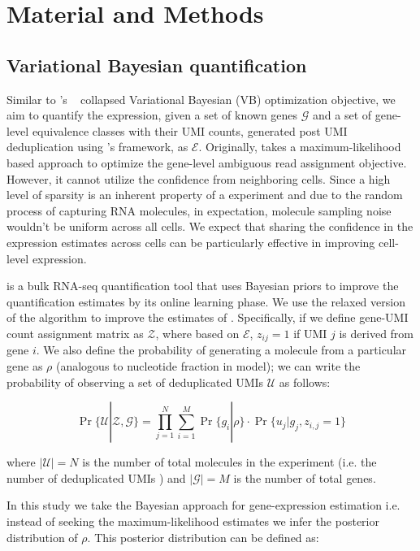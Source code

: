 \section{Material and Methods}
\label{sec:alv2_methods}

\subsection{Variational Bayesian \dscrnaseq quantification}
Similar to \salmon 's ~\citep{salmon} collapsed Variational Bayesian (VB) optimization 
objective, we aim to quantify the expression, given a set of known genes $\mathcal{G}$ and a set
of gene-level equivalence classes with their UMI counts, generated post UMI deduplication using \alevin 's 
framework, as $\mathcal{E}$. Originally, \alevin takes a maximum-likelihood based approach to 
optimize the gene-level ambiguous read assignment objective. However, it cannot utilize the 
confidence from neighboring cells. Since a high level of sparsity is an inherent property of a \dscrnaseq
experiment and due to the random process of capturing RNA molecules, in expectation, molecule 
sampling noise wouldn't be uniform across all cells. We expect that sharing the confidence in 
the expression estimates across cells can be particularly effective in improving cell-level expression. 

\salmon is a bulk RNA-seq quantification tool that uses Bayesian priors to improve the 
quantification estimates by its online learning phase. We use the relaxed version of the algorithm 
to improve the estimates of \alevin. Specifically, if we define gene-UMI count 
assignment matrix as $\mathcal{Z}$, where based on $\mathcal{E}$, $z_{ij}=1$ if UMI $j$ is derived from 
gene $i$. We also define the probability of generating a molecule from a particular gene as $\rho$ (analogous to 
nucleotide fraction in \salmon model); we can write the probability of observing a set of deduplicated 
UMIs $\mathcal{U}$ as follows:

\begin{equation}
    \Pr\{\mathcal{U} | \mathcal{Z},\mathcal{G}\} = 
    \prod_{j=1}^{N}\sum_{i=1}^{M}\Pr\{ g_i | \rho \} \cdot \Pr\{ u_j | g_j, z_{i,j} = 1 \}
\end{equation}
 
 where $|\mathcal{U}| = N$ is the number of total molecules in the experiment (i.e. the number of 
 deduplicated UMIs ) and $|\mathcal{G}| = M$ is the number of total genes.
 
In this study we take the Bayesian approach for gene-expression estimation i.e. instead of 
seeking the maximum-likelihood estimates we infer the posterior distribution of $\rho$. 
This posterior distribution can be defined as:

